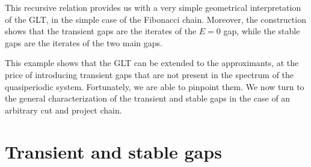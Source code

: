 \documentclass[a4paper]{jpconf}
\begin{document}
This recursive relation provides us with a very simple geometrical interpretation of the GLT, in the simple case of the Fibonacci chain.
Moreover, the construction shows that the transient gaps are the iterates of the $E=0$ gap, while the stable gaps are the iterates of the two main gaps.

This example shows that the GLT can be extended to the approximants, at the price of introducing transient gaps that are not present in the spectrum of the quasiperiodic system. 
Fortunately, we are able to pinpoint them.
We now turn to the general characterization of the transient and stable gaps in the case of an arbitrary cut and project chain.
\section{Transient and stable gaps}
\end{document}
